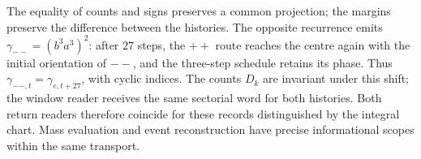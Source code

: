 The equality of counts and signs preserves a common projection; the
margins preserve the difference between the histories. The opposite
recurrence emits \(\gamma_{--}=(b^3a^3)^2\): after \(27\) steps,
the \({++}\) route reaches the centre again with the initial
orientation of \({--}\), and the three-step schedule retains its phase.
Thus \(\gamma_{--,t}=\gamma_{e,t+27}\), with cyclic indices.
The counts \(D_k\) are invariant under this shift; the window reader
receives the same sectorial word for both histories. Both return
readers therefore coincide for these records distinguished by
the integral chart. Mass evaluation and
event reconstruction have precise informational scopes
within the same transport.
